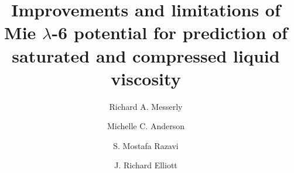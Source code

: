 \documentclass[preprint,review,12pt]{elsarticle}
\begin{document}
	
	\begin{frontmatter}
		
		
		
		\title{Improvements and limitations of Mie $\lambda$-6 potential for prediction of saturated and compressed liquid viscosity}
		
		
		\author{Richard A. Messerly}
		\address{Thermodynamics Research Center, National Institute of Standards and Technology, Boulder, Colorado, 80305}
		
		\author{Michelle C. Anderson}
		\address{Thermodynamics Research Center, National Institute of Standards and Technology, Boulder, Colorado, 80305}
		
		\author{S. Mostafa Razavi}
		\address{Department of Chemical and Biomolecular Engineering, The University of Akron}
		
		\author{J. Richard Elliott}
		\address{Department of Chemical and Biomolecular Engineering, The University of Akron}
		

\end{frontmatter}
\end{document}
